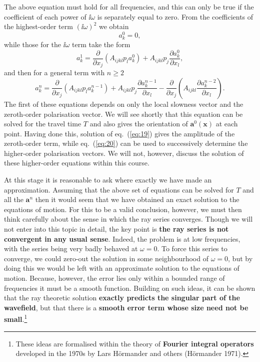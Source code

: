 The above equation must hold for all frequencies, and this can only be true if the coefficient of each power of $\ii\omega$ is separately equal to zero. From the coefficients of the highest-order term $(\ii\omega)^{2}$ we obtain
\begin{equation}
[A_{ijkl}p_{j}p_{l}-\rho\delta_{ik}]a_{k}^{0}=0,
\label{eq:18}
\end{equation}
while those for the $\ii\omega$ term take the form
\begin{equation}
[A_{ijkl}p_{j}p_{l}-\rho\delta_{ik}]a_{k}^{1}=\frac{\partial}{\partial x_{j}}(A_{ijkl}p_{l}a_{k}^{0})+A_{ijkl}p_{j}\frac{\partial a_{k}^{0}}{\partial x_{l}},
\label{eq:19}
\end{equation}
and then for a general term with $n\ge2$
\begin{equation}
[A_{ijkl}p_{j}p_{l}-\rho\delta_{ik}]a_{k}^{n}=\frac{\partial}{\partial x_{j}}(A_{ijkl}p_{l}a_{k}^{n-1})+A_{ijkl}p_{j}\frac{\partial a_{k}^{n-1}}{\partial x_{l}}-\frac{\partial}{\partial x_{j}}\left(A_{ijkl}\frac{\partial a_{k}^{n-2}}{\partial x_{l}}\right).
\label{eq:20}
\end{equation}
The first of these equations depends on only the local slowness vector and the zeroth-order polarisation vector. We will see shortly that 
this equation can be solved for the travel time $T$ and also gives the orientation of $\mathbf{a}^{0}(\mathbf{x})$ at each point. 
Having done this, solution of eq.~(\ref{eq:19}) gives the amplitude of the zeroth-order term, while eq.~(\ref{eq:20}) can be used to successively 
determine the higher-order polarisation vectors. We will not, however, discuss the solution of these higher-order equations
 within this course.

At this stage it is reasonable to ask where exactly we have made an approximation. Assuming that the above set of equations 
can be solved for $T$ and all the $\mathbf{a}^{n}$ then it would seem that we have obtained an exact solution to the equations of motion. 
For this to be a valid conclusion, however, we must then think carefully about the sense in which the ray series converges. 
Though we will not enter into this topic in detail, the key point is \textbf{the ray series is not convergent in any usual sense}. 
Indeed, the problem is at low frequencies, with the series being very badly behaved at $\omega=0$. To force this series to converge, 
we could zero-out the solution in some neighbourhood of $\omega=0$, but by doing this we would be left with an approximate 
solution to the equations of motion. Because, however, the error lies only within a bounded range of frequencies it must be a smooth 
function. Building on such ideas, it can be shown that the ray theoretic solution \textbf{exactly predicts the 
 singular part of the wavefield}, but that there is a \textbf{smooth error term whose size need not be small}.\footnote{These ideas are
formalised within the theory of \textbf{Fourier integral operators} developed in the 1970s by Lars H\"{o}rmander and others (H\"{o}rmander 1971).}

